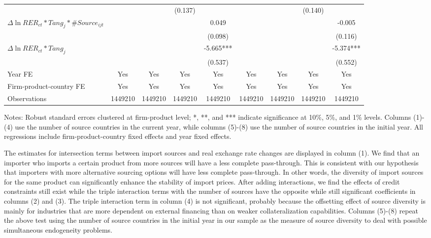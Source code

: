 \begin{table}
{\begin{threeparttable}
\begin{tabular}{lcccccccc}
			&   &       & (0.137) &       &       &       & (0.140) &  \\
			$\Delta \ln RER_{ct}*Tang_{j}*\#Source_{ijt}$ &    &       &       & 0.049 &       &       &       & -0.005 \\
			&    &       &       & (0.098) &       &       &       & (0.116) \\
			$\Delta \ln RER_{ct}*Tang_{j}$ &   &       &       & -5.665*** &       &       &       & -5.374*** \\
			&  &       &       & (0.537) &       &       &       & (0.552) \\
                \midrule
			Year FE  & Yes   & Yes   & Yes   & Yes & Yes   & Yes   & Yes   & Yes\\
			Firm-product-country FE & Yes   & Yes   & Yes   & Yes & Yes   & Yes   & Yes   & Yes\\
			Observations & 1449210 & 1449210 & 1449210 & 1449210 & 1449210 & 1449210 & 1449210 & 1449210\\
			\bottomrule
		\end{tabular}
		\begin{tablenotes}
			\footnotesize
			\item Notes: Robust standard errors clustered at firm-product level; *, **, and *** indicate significance at 10\%, 5\%, and 1\% levels. Columns (1)-(4) use the number of source countries in the current year, while columns (5)-(8) use the number of source countries in the initial year. All regressions include firm-product-country fixed effects and year fixed effects.
		\end{tablenotes}
	\end{threeparttable}
	}
	\label{tab.source}
\end{table}

The estimates for intersection terms between import sources and real exchange rate changes are displayed in column (1). We find that an importer who imports a certain product from more sources will have a less complete pass-through. This is consistent with our hypothesis that importers with more alternative sourcing options will have less complete pass-through. In other words, the diversity of import sources for the same product can significantly enhance the stability of import prices. After adding interactions, we find the effects of credit constraints still exist while the triple interaction terms with the number of sources have the opposite while still significant coefficients in columns (2) and (3). The triple interaction term in column (4) is not significant, probably because the offsetting effect of source diversity is mainly for industries that are more dependent on external financing than on weaker collateralization capabilities. Columns (5)-(8) repeat the above test using the number of source countries in the initial year in our sample as the measure of source diversity to deal with possible simultaneous endogeneity problems. 

